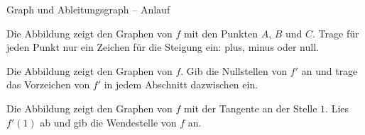 \begin{aufgabe}{Graph und Ableitungsgraph – Anlauf}
\begin{teile}
\teil Die Abbildung zeigt den Graphen von $f$ mit den Punkten $A$, $B$ und $C$. Trage für jeden Punkt nur ein Zeichen für die Steigung ein: plus, minus oder null.

\begin{ksys}[xmin=-3,xmax=3,ymin=-3,ymax=3,ablesen]     \end{ksys}
\teil Die Abbildung zeigt den Graphen von $f$. Gib die Nullstellen von $f'$ an und trage das Vorzeichen von $f'$ in jedem Abschnitt dazwischen ein.

\begin{ksys}[xmin=-3,xmax=3,ymin=-3,ymax=3,ablesen]  \end{ksys}
\teil Die Abbildung zeigt den Graphen von $f$ mit der Tangente an der Stelle $1$. Lies $f'(1)$ ab und gib die Wendestelle von $f$ an.

\begin{ksys}[xmin=-1,xmax=5,ymin=-1,ymax=5,ablesen]   \end{ksys}
\end{teile}
\end{aufgabe}

